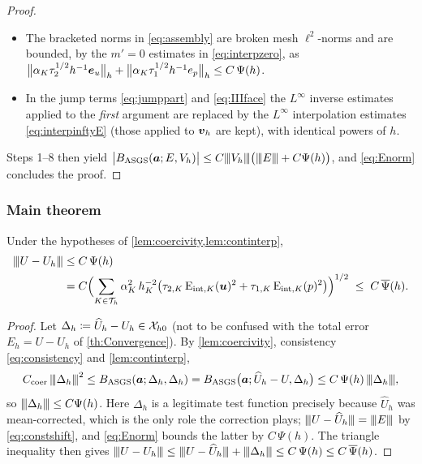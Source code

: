 \begin{proof}
\begin{itemize}[leftmargin=2em]
\begin{equation}
  + \tau_{1,K}(\Eint{K}{p})^2\bigr)\Bigr)^{1/2}
  = C\,\Psi(h),
\end{equation}
the middle expression being $\Psi(h)$ of \eqref{eq:psih} written out.
\item The bracketed norms in \eqref{eq:assembly} are broken mesh $\ell^2${\hyp}norms and are
bounded, by the $m'=0$ estimates in \eqref{eq:interpzero}, as
$\bigl\lVert\alpha_K\tau_2^{1/2}h^{-1}\boldsymbol{e}_{u}\bigr\rVert_h
+\bigl\lVert\alpha_K\tau_1^{1/2}h^{-1}e_p\bigr\rVert_h\le C\,\Psi(h)$.
\item In the jump terms \eqref{eq:jumppart} and \eqref{eq:IIIface} the $L^\infty$ inverse
estimates applied to the \emph{first} argument are replaced by the $L^\infty$
interpolation estimates \eqref{eq:interpinftyE} (those applied to $\boldsymbol{v}_h$ are kept), with
identical powers of $h$.
\end{itemize}
Steps 1--8 then yield
$\bigl|B_{\mathrm{ASGS}} (\boldsymbol{a};E,V_h)\bigr|\le C{\lvert\kern-0.25ex\lvert\kern-0.25ex\lvert V_h \rvert\kern-0.25ex\rvert\kern-0.25ex\rvert}\bigl({\lvert\kern-0.25ex\lvert\kern-0.25ex\lvert E \rvert\kern-0.25ex\rvert\kern-0.25ex\rvert}+C\Psi(h)\bigr)$, and
\eqref{eq:Enorm} concludes the proof.
\end{proof}

\subsubsection{Main theorem}

\begin{theorem}[Convergence]\label{thm:convergence}
Under the hypotheses of \cref{lem:coercivity,lem:continterp},
\begin{equation}\label{eq:convergence}
\begin{aligned}
  {\lvert\kern-0.25ex\lvert\kern-0.25ex\lvert U-U_h \rvert\kern-0.25ex\rvert\kern-0.25ex\rvert}
  &\le C\,\Psi(h) \\
  &= C\Bigl(\sum_{K\in\mathcal{T}_h}\alpha_K^2\,h_K^{-2}
  \bigl(\tau_{2,K}\,\mathrm{E}_{\mathrm{int},K}(\boldsymbol{u})^2+\tau_{1,K}\,\mathrm{E}_{\mathrm{int},K}(p)^2\bigr)\Bigr)^{1/2}
  \;\le\; C\,\overline{\Psi}(h).
\end{aligned}
\end{equation}
\end{theorem}

\begin{proof}
Let $\Delta_h\coloneqq\widehat{U}_h-U_h\in\mathcal{X}_{h0}$ (not to be confused with the total error
$E_h = U-U_h$ of \cref{th:Convergence}). By \cref{lem:coercivity},
consistency \eqref{eq:consistency} and \cref{lem:continterp},
\begin{equation*}
  C_{\mathrm{coer}}\,{\lvert\kern-0.25ex\lvert\kern-0.25ex\lvert \Delta_h \rvert\kern-0.25ex\rvert\kern-0.25ex\rvert}^2
  \le B_{\mathrm{ASGS}} (\boldsymbol{a};\Delta_h,\Delta_h)
  = B_{\mathrm{ASGS}} \bigl(\boldsymbol{a};\widehat{U}_h-U,\Delta_h\bigr)
  \le C\,\Psi(h)\,{\lvert\kern-0.25ex\lvert\kern-0.25ex\lvert \Delta_h \rvert\kern-0.25ex\rvert\kern-0.25ex\rvert},
\end{equation*}
so ${\lvert\kern-0.25ex\lvert\kern-0.25ex\lvert \Delta_h \rvert\kern-0.25ex\rvert\kern-0.25ex\rvert}\le C\Psi(h)$. Here $\Delta_h$ is a legitimate test function precisely
because $\widehat{U}_h$ was mean{\hyp}corrected, which is the only role the correction plays;
${\lvert\kern-0.25ex\lvert\kern-0.25ex\lvert U-\widehat{U}_h \rvert\kern-0.25ex\rvert\kern-0.25ex\rvert}={\lvert\kern-0.25ex\lvert\kern-0.25ex\lvert E \rvert\kern-0.25ex\rvert\kern-0.25ex\rvert}$ by \eqref{eq:constshift}, and \eqref{eq:Enorm}
bounds the latter by $C\,\Psi(h)$. The triangle inequality then gives
${\lvert\kern-0.25ex\lvert\kern-0.25ex\lvert U-U_h \rvert\kern-0.25ex\rvert\kern-0.25ex\rvert}\le{\lvert\kern-0.25ex\lvert\kern-0.25ex\lvert U-\widehat{U}_h \rvert\kern-0.25ex\rvert\kern-0.25ex\rvert}+{\lvert\kern-0.25ex\lvert\kern-0.25ex\lvert \Delta_h \rvert\kern-0.25ex\rvert\kern-0.25ex\rvert}\le C\,\Psi(h)\le C\,\overline{\Psi}(h)$.
\end{proof}

